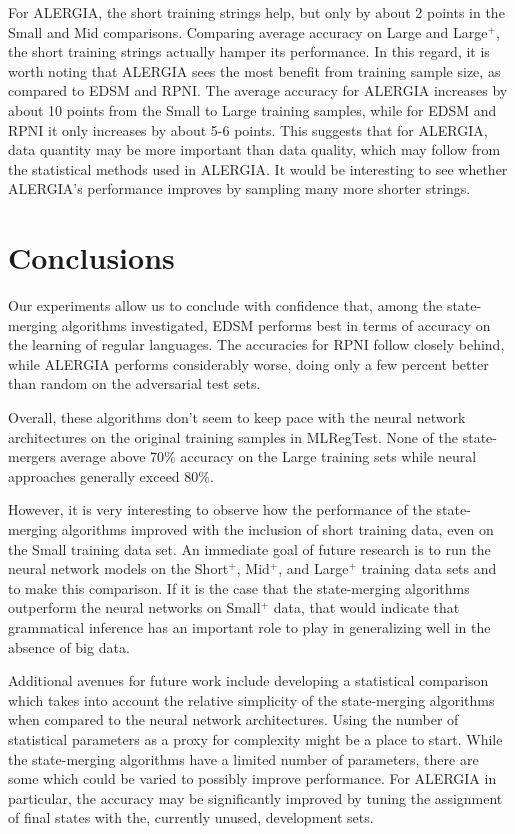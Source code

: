 \documentclass[twoside,11pt]{article}
\newcommand{\note}[3]{{
    \normalfont
    \noindent
    \textcolor{#1}{\textbf{#2}: #3}
}}
\newcommand{\adil}[1]{\note{Orchid}{Adil}{#1}}
\begin{document}
For ALERGIA, the short training strings help, but only by about 2 points in the Small and Mid comparisons. Comparing average accuracy on Large and Large$^+$, the short training strings actually hamper its performance.
In this regard, it is worth noting that ALERGIA sees the most benefit from training sample size, as compared to EDSM and RPNI. 
The average accuracy for ALERGIA increases by about 10 points from the Small to Large training samples, while for EDSM and RPNI it only increases by about 5-6 points. 
This suggests that for ALERGIA, data quantity may be more important than data quality, which may follow from the statistical methods used in ALERGIA. It would be interesting to see whether ALERGIA's performance improves by sampling many more shorter strings.

\section{Conclusions} %

Our experiments allow us to conclude with confidence that, among the state-merging algorithms investigated, EDSM performs best in terms of accuracy on the learning of regular languages. The accuracies for RPNI follow closely behind, while ALERGIA performs considerably worse, doing only a few percent better than random on the adversarial test sets. 

Overall, these algorithms don't seem to keep pace with the neural network architectures on the original training samples in MLRegTest. None of the state-mergers average above 70\% accuracy on the Large training sets while neural approaches generally exceed 80\%.

However, it is very interesting to observe how the performance of the state-merging algorithms improved with the inclusion of short training data, even on the Small training data set. 
An immediate goal of future research is to run the neural network models on the Short$^+$, Mid$^+$, and Large$^+$ training data sets and to make this comparison. 
If it is the case that the state-merging algorithms outperform the neural networks on Small$^+$ data, that would indicate that grammatical inference has an important role to play in generalizing well in the absence of big data.


Additional avenues for future work include developing a statistical comparison which takes into account the relative simplicity of the state-merging algorithms when compared to the neural network architectures. 
Using the number of statistical parameters as a proxy for complexity might be a place to start. 
While the state-merging algorithms have a limited number of parameters, there are some which could be varied to possibly improve performance. 
For ALERGIA in particular, the accuracy may be significantly improved by tuning the assignment of final states with the, currently unused, development sets.
\end{document}
